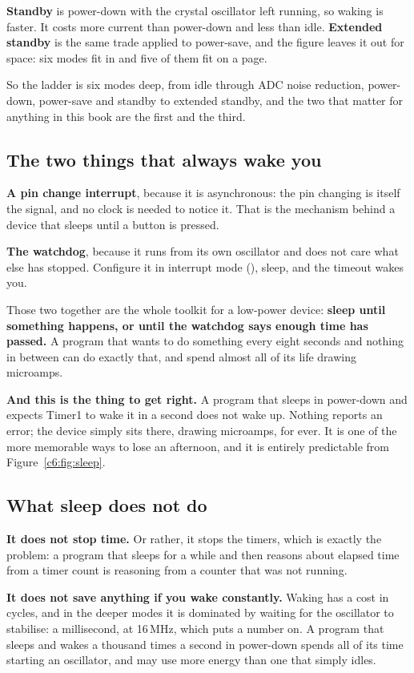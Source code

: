 \textbf{Standby} is power-down with the crystal oscillator left running, so waking is faster. It
costs more current than power-down and less than idle. \textbf{Extended standby} is the same trade
applied to power-save, and the figure leaves it out for space: six modes fit in  and
five of them fit on a page.

So the ladder is six modes deep, from idle through ADC noise reduction, power-down, power-save and
standby to extended standby, and the two that matter for anything in this book are the first and
the third.

\subsection{The two things that always wake you}
\label{c6:sec:wake}
\textbf{A pin change interrupt}, because it is asynchronous: the pin changing is itself the
signal, and no clock is needed to notice it. That is the mechanism behind a device that sleeps
until a button is pressed.

\textbf{The watchdog}, because it runs from its own oscillator and does not care what else has
stopped. Configure it in interrupt mode (), sleep, and the timeout wakes you.

Those two together are the whole toolkit for a low-power device: \textbf{sleep until something
happens, or until the watchdog says enough time has passed.} A program that wants to do something
every eight seconds and nothing in between can do exactly that, and spend almost all of its life
drawing microamps.

\textbf{And this is the thing to get right.} A program that sleeps in power-down and expects Timer1
to wake it in a second does not wake up. Nothing reports an error; the device simply sits there,
drawing microamps, for ever. It is one of the more memorable ways to lose an afternoon, and it is
entirely predictable from Figure~\ref{c6:fig:sleep}.

\subsection{What sleep does not do}
\label{c6:sec:sleepnot}
\textbf{It does not stop time.} Or rather, it stops the timers, which is exactly the problem: a
program that sleeps for a while and then reasons about elapsed time from a timer count is
reasoning from a counter that was not running.

\textbf{It does not save anything if you wake constantly.} Waking has a cost in cycles, and in the
deeper modes it is dominated by waiting for the oscillator to stabilise: a millisecond, at
16\,MHz, which  puts a number on. A program that sleeps and wakes a thousand
times a second in power-down spends all of its time starting an oscillator, and may use more
energy than one that simply idles.

